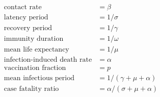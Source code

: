 \begin{align*}

\textrm{contact rate} &= \beta

\\

\textrm{latency period} &= 1/\sigma

\\

\textrm{recovery period} &= 1/\gamma

\\

\textrm{immunity duration} &= 1/\omega

\\

\textrm{mean life expectancy} &= 1/\mu

\\

\textrm{infection-induced death rate} &= \alpha

\\

\textrm{vaccination fraction} &= p

\\

\textrm{mean infectious period} &= 1/(\gamma + \mu + \alpha)

\\

\textrm{case fatality ratio} &= \alpha / (\sigma + \mu + \alpha)

\end{align*}